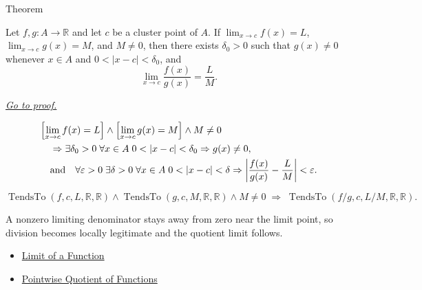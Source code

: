 \begin{theorembox}{Theorem}
\begin{theorem}
\label{thm:limit-quotient}
Let $f,g:A\to\mathbb{R}$ and let $c$ be a cluster point of $A$. If
$\lim_{x\to c}f(x)=L$, $\lim_{x\to c}g(x)=M$, and $M\neq 0$, then
there exists $\delta_0>0$ such that $g(x)\neq 0$ whenever $x\in A$ and
$0<|x-c|<\delta_0$, and
\[
  \lim_{x\to c}\frac{f(x)}{g(x)}=\frac{L}{M}.
\]

\smallskip\noindent
\hyperref[prf:limit-quotient]{\textit{Go to proof.}}
\end{theorem}
\end{theorembox}

\begin{remark*}
\[
\begin{aligned}
&\Bigl[\lim_{x\to c}f(x)=L\Bigr]\wedge\Bigl[\lim_{x\to c}g(x)=M\Bigr]\wedge M\neq 0 \\
&\quad\Rightarrow
\exists\delta_0>0\;\forall x\in A\;
0<|x-c|<\delta_0\Rightarrow g(x)\neq 0, \\
&\quad\text{and}\quad
\forall\varepsilon>0\;\exists\delta>0\;\forall x\in A\;
0<|x-c|<\delta\Rightarrow
\left|\frac{f(x)}{g(x)}-\frac{L}{M}\right|<\varepsilon.
\end{aligned}
\]
\end{remark*}

\begin{remark*}
\[
  \operatorname{TendsTo}(f,c,L,\mathbb{R},\mathbb{R})\wedge\operatorname{TendsTo}(g,c,M,\mathbb{R},\mathbb{R})\wedge M\neq 0
  \;\Longrightarrow\;
  \operatorname{TendsTo}(f/g,c,L/M,\mathbb{R},\mathbb{R}).
\]
\end{remark*}

\begin{remark*}[Interpretation]
A nonzero limiting denominator stays away from zero near the limit point,
so division becomes locally legitimate and the quotient limit follows.
\end{remark*}

\begin{dependencies}
\begin{itemize}
  \item \hyperref[def:limit-function]{Limit of a Function}
  \item \hyperref[def:pointwise-quotient-of-functions]{Pointwise Quotient of Functions}
\end{itemize}
\end{dependencies}
